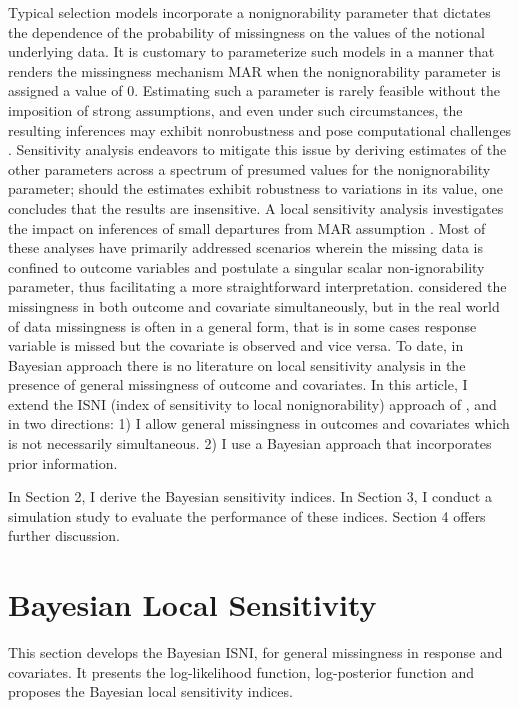 \documentclass[twoside]{article}
\begin{document}
Typical selection models incorporate a nonignorability parameter that dictates the dependence of the probability of missingness on the values of the notional underlying data. It is customary to parameterize such models in a manner that renders the missingness mechanism MAR when the nonignorability parameter is assigned a value of 0. Estimating such a parameter is rarely feasible without the imposition of strong assumptions, and even under such circumstances, the resulting inferences may exhibit nonrobustness and pose computational challenges \citep{Diggle:Kenward:1994,Robins:et:als:2000,Scharfstein:et:al:2003}. Sensitivity analysis endeavors to mitigate this issue by deriving estimates of the other parameters across a spectrum of presumed values for the nonignorability parameter; should the estimates exhibit robustness to variations in its value, one concludes that the results are insensitive.
A local sensitivity analysis investigates the impact on inferences of small departures from MAR   assumption \citep{Troxel:et:al:2004,Zhang:Heitjan:2007,Eftekhari:2018,Momeni:Eftekhari:2024}. %
 Most of these analyses have primarily addressed scenarios wherein the missing  data is confined to outcome variables and  postulate a singular scalar non-ignorability parameter, thus facilitating a more straightforward interpretation. \cite{Gao:et:al:2016} considered the missingness  in both outcome and covariate simultaneously, but in the real world of data missingness is often in a general form, that is in some cases response variable is missed but the covariate is observed and vice versa. To date, in Bayesian approach there is no literature on local sensitivity analysis in the presence of  general missingness of outcome and covariates.  In this article, I extend the ISNI (index of sensitivity to local nonignorability) approach of \cite{Zhang:Heitjan:2007}, \cite{Gao:et:al:2016} and  \cite{Momeni:Eftekhari:2024}  in two directions: 1) I allow general missingness in outcomes and covariates which is not necessarily simultaneous. 2)  I use a Bayesian approach that incorporates prior information. 

In Section 2, I derive the Bayesian sensitivity indices. In Section 3, I conduct a simulation study to  evaluate the performance of these indices. Section 4 offers further discussion.
 
 
\section{Bayesian Local Sensitivity}
This section develops the Bayesian ISNI,  for general missingness in response and covariates. It presents the log-likelihood function, log-posterior function and proposes the Bayesian local  sensitivity indices.
\end{document}
